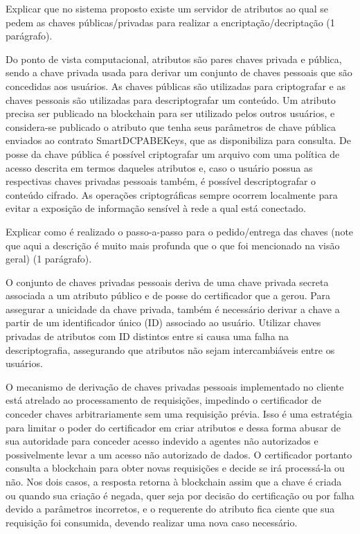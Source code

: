 \documentclass[a4paper,11pt]{article}
\begin{document}
{\color{ForestGreen}Explicar que no sistema proposto existe um servidor de atributos ao qual se pedem as chaves públicas/privadas para realizar a encriptação/decriptação (1 parágrafo).}

Do ponto de vista computacional, atributos são pares chaves privada e pública, sendo a chave privada usada para derivar um conjunto de chaves pessoais que são concedidas aos usuários. As chaves públicas são utilizadas para criptografar e as chaves pessoais são utilizadas para descriptografar um conteúdo.
Um atributo precisa ser publicado na blockchain para ser utilizado pelos outros usuários, e considera-se publicado o atributo que tenha seus parâmetros de chave pública enviados ao contrato SmartDCPABEKeys, que as disponibiliza para consulta.
De posse da chave pública é possível criptografar um arquivo com uma política de acesso descrita em termos daqueles atributos e, caso o usuário possua as respectivas chaves privadas pessoais também, é possível descriptografar o conteúdo cifrado.
As operações criptográficas sempre ocorrem localmente para evitar a exposição de informação sensível à rede a qual está conectado.

{\color{ForestGreen}Explicar como é realizado o passo-a-passo para o pedido/entrega das chaves (note que aqui a descrição é muito mais profunda que o que foi mencionado na visão geral) (1 parágrafo).}

O conjunto de chaves privadas pessoais deriva de uma chave privada secreta associada a um atributo público e de posse do certificador que a gerou.
Para assegurar a unicidade da chave privada, também é necessário derivar a chave a partir de um identificador único (ID) associado ao usuário.
Utilizar chaves privadas de atributos com ID distintos entre si causa uma falha na descriptografia, assegurando que atributos não sejam intercambiáveis entre os usuários.

O mecanismo de derivação de chaves privadas pessoais implementado no cliente está atrelado ao processamento de requisições, impedindo o certificador de conceder chaves arbitrariamente sem uma requisição prévia.
Isso é uma estratégia para limitar o poder do certificador em criar atributos e dessa forma abusar de sua autoridade para conceder acesso indevido a agentes não autorizados e possivelmente levar a um acesso não autorizado de dados.
O certificador portanto consulta a blockchain para obter novas requisições e decide se irá processá-la ou não.
Nos dois casos, a resposta retorna à blockchain assim que a chave é criada ou quando sua criação é negada, quer seja por decisão do certificação ou por falha devido a parâmetros incorretos, e o requerente do atributo fica ciente que sua requisição foi consumida, devendo realizar uma nova caso necessário.
\end{document}
